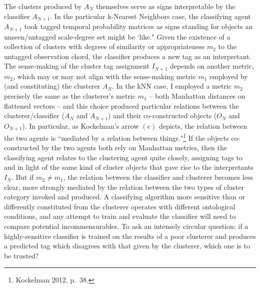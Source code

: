 The clusters produced by $A_N$ themselves serve as signs interpretable by the classifier $A_{N+1}$.  In the particular k-Nearest Neighbors case, the classifying agent $A_{N+1}$ took tagged temporal probability matrices as signs standing for objects an unseen/untagged scale-degree set might be `like."  Given the existence of a collection of clusters with degrees of similarity or appropriateness $m_2$ to the untagged observation chord, the classifier produces a new tag as an interpretant.  The sense-making of the cluster tag assignment $I_{N+1}$ depends on another metric, $m_2$, which may or may not align with the sense-making metric $m_1$ employed by (and constituting) the clusterer $A_{N}$.  In the kNN case, I employed a metric $m_2$ precisely the same as the clusterer's metric $m_1$ -- both Manhattan distances on flattened vectors -- and this choice produced particular relations between the clusterer/classifier ($A_N$ and $A_{N+1}$) and their co-constructed objects ($O_N$ and $O_{N+1}$).  In particular, as Kockelman's arrow $(e)$ depicts, the relation between the two agents is ``mediated by a relation between things."\footnote{Kockelman 2012, p.\ 38.}  If the objects co-constructed by the two agents both rely on Manhattan metrics, then the classifying agent relates to the clustering agent quite closely, assigning tags to and in light of the same kind of cluster objects that gave rise to the interpretants $I_N$.  But if $m_2 \neq m_1$, the relation between the classifier and clusterer becomes less clear, more strongly mediated by the relation between the two types of cluster category invoked and produced.  A classifying algorithm more sensitive than or differently constituted from the clusterer operates with different ontological conditions, and any attempt to train and evaluate the classifier will need to compare potential incommensurables.  To ask an intensely circular question: if a highly-sensitive classifier is trained on the results of a poor clusterer and produces a predicted tag which disagrees with that given by the clusterer, which one is to be trusted?

